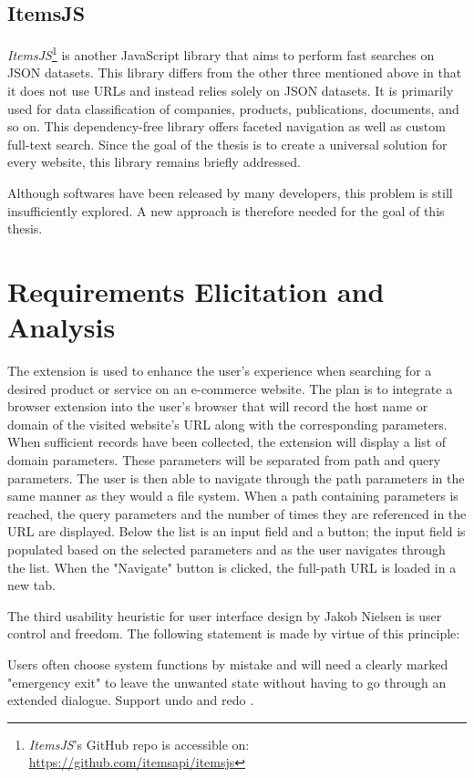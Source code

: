\subsection*{ItemsJS}
\emph{ItemsJS}\footnote{\emph{ItemsJS}'s GitHub repo is accessible on: \url{https://github.com/itemsapi/itemsjs}} is another JavaScript library that aims to perform fast searches on JSON datasets. This library differs from the other three mentioned above in that it does not use URLs and instead relies solely on JSON datasets. It is primarily used for data classification of companies, products, publications, documents, and so on. This dependency-free library offers faceted navigation as well as custom full-text search. Since the goal of the thesis is to create a universal solution for every website, this library remains briefly addressed.

Although softwares have been released by many developers, this problem is still insufficiently explored. A new approach is therefore needed for the goal of this thesis.

\section{Requirements Elicitation and Analysis}
\label{requirements_analysis}
The extension is used to enhance the user's experience when searching for a desired product or service on an e-commerce website. The plan is to integrate a browser extension into the user's browser that will record the host name or domain of the visited website's URL along with the corresponding parameters. When sufficient records have been collected, the extension will display a list of domain parameters. These parameters will be separated from path and query parameters. The user is then able to navigate through the path parameters in the same manner as they would a file system. When a path containing parameters is reached, the query parameters and the number of times they are referenced in the URL are displayed. Below the list is an input field and a button; the input field is populated based on the selected parameters and as the user navigates through the list. When the "Navigate" button is clicked, the full-path URL is loaded in a new tab.

The third usability heuristic for user interface design by Jakob Nielsen is user control and freedom. The following statement is made by virtue of this principle:

\begin{displayquote}
  Users often choose system functions by mistake and will need a clearly marked "emergency exit" to leave the unwanted state without having to go through an extended dialogue. Support undo and redo \autocite{nielsen1994usability}.
\end{displayquote}

